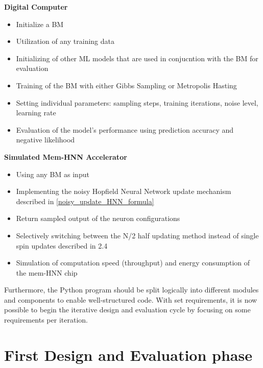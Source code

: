\textbf{Digital Computer}
\begin{itemize}
    \item Initialize a \ac{BM}
    \item Utilization of any training data
    \item Initializing of other ML models that are used in conjucntion with the \ac{BM} for evaluation
    \item Training of the \ac{BM} with either Gibbs Sampling or Metropolis Hasting
    \item Setting individual parameters: sampling steps, training iterations, noise level, learning rate 
    \item Evaluation of the model's performance using prediction accuracy and negative likelihood
\end{itemize}
\textbf{Simulated Mem-HNN Accelerator}
\begin{itemize}
    \item Using any \ac{BM} as input
    \item Implementing the noisy Hopfield Neural Network update mechanism described in \ref{noisy_update_HNN_formula}
    \item Return sampled output of the neuron configurations 
    \item Selectively switching between the N/2 half updating method instead of single spin updates described in 2.4
    \item Simulation of computation speed (throughput) and energy consumption of the \ac{mem-HNN} chip
\end{itemize}
Furthermore, the Python program should be split logically into different modules and components to enable well-structured code. 
With set requirements, it is now possible to begin the iterative design and evaluation cycle by focusing on some requirements per iteration.

\section{First Design and Evaluation phase}


